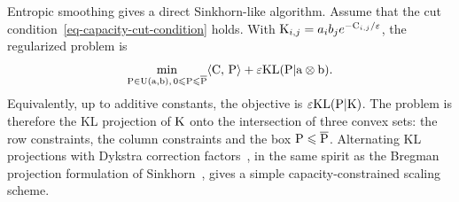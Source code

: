 Entropic smoothing gives a direct Sinkhorn-like algorithm. Assume that the cut condition~\eqref{eq-capacity-cut-condition} holds. With $\K_{i,j}=a_i b_j e^{-\C_{i,j}/\epsilon}$, the regularized problem is
\begin{equation}\label{eq-entropic-capacity-constrained-ot}
	\min_{\P\in\CouplingsD(\a,\b),\,0\leq \P\leq \overline{\P}}
	\dotp{\C}{\P}
	+
	\epsilon\KLD(\P|\a\otimes\b).
\end{equation}
Equivalently, up to additive constants, the objective is $\epsilon\KLD(\P|\K)$. The problem is therefore the KL projection of $\K$ onto the intersection of three convex sets: the row constraints, the column constraints and the box $\P\leq \overline{\P}$. Alternating KL projections with Dykstra correction factors~\cite{Dykstra85,bauschke-lewis}, in the same spirit as the Bregman projection formulation of Sinkhorn~\cite{2015-benamou-cisc}, gives a simple capacity-constrained scaling scheme.

